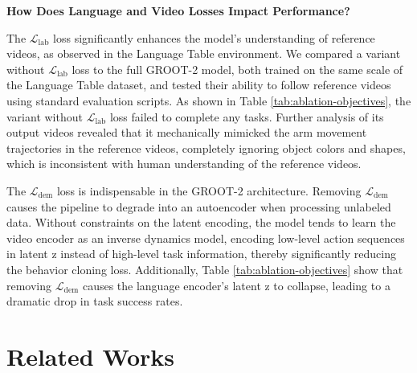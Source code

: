 \noindent \textbf{How Does Language and Video Losses Impact Performance?}

The $\mathcal{L}_\text{lab}$ loss significantly enhances the model’s understanding of reference videos, as observed in the Language Table environment. We compared a variant without $\mathcal{L}_\text{lab}$ loss to the full GROOT-2 model, both trained on the same scale of the Language Table dataset, and tested their ability to follow reference videos using standard evaluation scripts. As shown in Table \ref{tab:ablation-objectives}, the variant without $\mathcal{L}_\text{lab}$ loss failed to complete any tasks. Further analysis of its output videos revealed that it mechanically mimicked the arm movement trajectories in the reference videos, completely ignoring object colors and shapes, which is inconsistent with human understanding of the reference videos. 

The $\mathcal{L}_\text{dem}$ loss is indispensable in the GROOT-2 architecture. Removing $\mathcal{L}_\text{dem}$ causes the pipeline to degrade into an autoencoder when processing unlabeled data. Without constraints on the latent encoding, the model tends to learn the video encoder as an inverse dynamics model, encoding low-level action sequences in latent z instead of high-level task information, thereby significantly reducing the behavior cloning loss. Additionally, Table \ref{tab:ablation-objectives} show that removing $\mathcal{L}_\text{dem}$ causes the language encoder’s latent z to collapse, leading to a dramatic drop in task success rates. 

\section{Related Works}
\label{sec:related}

